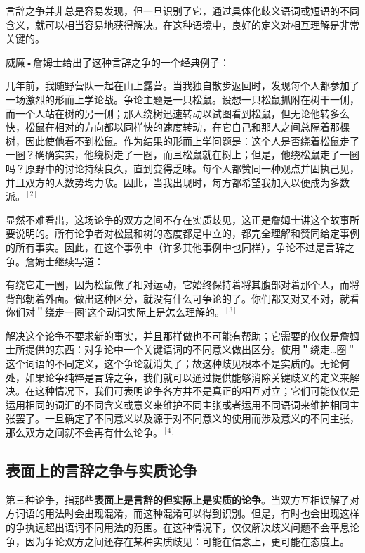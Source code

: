 言辞之争并非总是容易发现，但一旦识别了它，通过具体化歧义语词或短语的不同含义，就可以相当容易地获得解决。在这种语境中，良好的定义对相互理解是非常关键的。

威廉•詹姆士给出了这种言辞之争的一个经典例子：

\begin{displayquote}
几年前，我随野营队一起在山上露营。当我独自散步返回时，发现每个人都参加了一场激烈的形而上学论战。争论主题是一只松鼠。设想一只松鼠抓附在树干一侧，而一个人站在树的另一侧；那人绕树迅速转动以试图看到松鼠，但无论他转多么快，松鼠在相对的方向都以同样快的速度转动，在它自己和那人之间总隔着那棵树，因此使他看不到松鼠。作为结果的形而上学问题是：这个人是否绕着松鼠走了一圈？确确实实，他绕树走了一圈，而且松鼠就在树上；但是，他绕松鼠走了一圈吗？原野中的讨论持续良久，直到变得乏味。每个人都赞同一种观点并固执己见，并且双方的人数势均力敌。因此，当我出现时，每方都希望我加入以便成为多数派。$^{[2]}$
\end{displayquote}

显然不难看出，这场论争的双方之间不存在实质歧见，这正是詹姆士讲这个故事所要说明的。所有论争者对松鼠和树的态度都是中立的，都完全理解和赞同给定事例的所有事实。因此，在这个事例中（许多其他事例中也同样），争论不过是言辞之争。詹姆士继续写道：

\begin{displayquote}
有绕它走一圈，因为松鼠做了相对运动，它始终保持着将其腹部对着那个人，而将背部朝着外面。做出这种区分，就没有什么可争论的了。你们都又对又不对，就看你们对＂绕走一圈'这个动词实际上是怎么理解的。$^{[3]}$
\end{displayquote}

解决这个论争不要求新的事实，并且那样做也不可能有帮助；它需要的仅仅是詹姆士所提供的东西：对争论中一个关键语词的不同意义做出区分。使用＂绕走…圈＂这个词语的不同定义，这个争论就消失了；故这种歧见根本不是实质的。无论何处，如果论争纯粹是言辞之争，我们就可以通过提供能够消除关键歧义的定义来解决。在这种情况下，我们可表明论争各方并不是真正的相互对立；它们可能仅仅是运用相同的词汇的不同含义或意义来维护不同主张或者运用不同语词来维护相同主张罢了。一旦确定了不同意义以及源于对不同意义的使用而涉及意义的不同主张，那么双方之间就不会再有什么论争。$^{[4]}$

\subsection{表面上的言辞之争与实质论争}

第三种论争，指那些\textbf{表面上是言辞的但实际上是实质的论争}。当双方互相误解了对方词语的用法时会出现混淆，而这种混淆可以得到识别。但是，有时也会出现这样的争执远超出语词不同用法的范围。在这种情况下，仅仅解决歧义问题不会平息论争，因为争论双方之间还存在某种实质歧见：可能在信念上，更可能在态度上。


